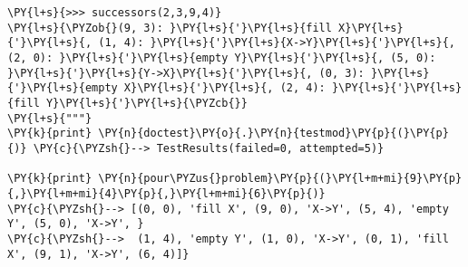 \begin{Verbatim}[commandchars=\\\{\}]
\PY{l+s}{>>> successors(2,3,9,4)}
\PY{l+s}{\PYZob{}(9, 3): }\PY{l+s}{'}\PY{l+s}{fill X}\PY{l+s}{'}\PY{l+s}{, (1, 4): }\PY{l+s}{'}\PY{l+s}{X->Y}\PY{l+s}{'}\PY{l+s}{, (2, 0): }\PY{l+s}{'}\PY{l+s}{empty Y}\PY{l+s}{'}\PY{l+s}{, (5, 0): }\PY{l+s}{'}\PY{l+s}{Y->X}\PY{l+s}{'}\PY{l+s}{, (0, 3): }\PY{l+s}{'}\PY{l+s}{empty X}\PY{l+s}{'}\PY{l+s}{, (2, 4): }\PY{l+s}{'}\PY{l+s}{fill Y}\PY{l+s}{'}\PY{l+s}{\PYZcb{}}
\PY{l+s}{"""}
\PY{k}{print} \PY{n}{doctest}\PY{o}{.}\PY{n}{testmod}\PY{p}{(}\PY{p}{)} \PY{c}{\PYZsh{}--> TestResults(failed=0, attempted=5)}

\PY{k}{print} \PY{n}{pour\PYZus{}problem}\PY{p}{(}\PY{l+m+mi}{9}\PY{p}{,}\PY{l+m+mi}{4}\PY{p}{,}\PY{l+m+mi}{6}\PY{p}{)}
\PY{c}{\PYZsh{}--> [(0, 0), 'fill X', (9, 0), 'X->Y', (5, 4), 'empty Y', (5, 0), 'X->Y', }
\PY{c}{\PYZsh{}-->  (1, 4), 'empty Y', (1, 0), 'X->Y', (0, 1), 'fill X', (9, 1), 'X->Y', (6, 4)]}
\end{Verbatim}
